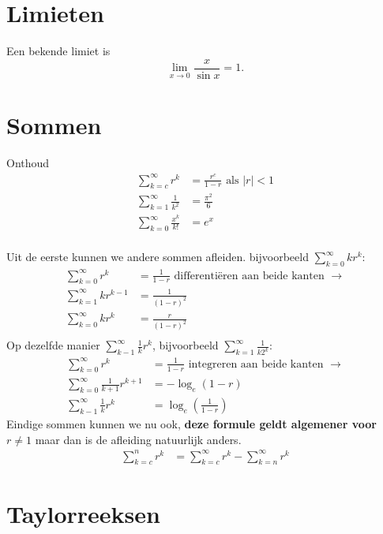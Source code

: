 \documentclass{article}
\begin{document}
	\tableofcontents
	\newpage

	\section{Limieten}\label{sec:limieten}
    Een bekende limiet is
    \[
        \lim_{x\to 0} \frac{x}{\sin x} = 1.
    \]
	\section{Sommen}\label{sec:sommen}
 		Onthoud
 		\begin{align*}
 			\sum_{k=c}^{\infty} r^k &= \frac{r^c}{1-r} \text{ als $|r|<1$}\\
 			\sum_{k=1}^{\infty} \frac{1}{k^2} &= \frac{\pi^2}{6} \\
 			\sum_{k=0}^\infty \frac{x^k}{k!} &= e^x \\
 		\end{align*}
 		
 		Uit de eerste kunnen we andere sommen afleiden.
 		bijvoorbeeld
 		$\displaystyle \sum_{k=0}^{\infty} kr^k: $
 		\begin{align*}
 				\sum_{k=0}^{\infty} r^k &= \frac{1}{1-r} \text { differenti\"eren aan beide kanten } \to \\
 				\sum_{k=1}^{\infty} kr^{k-1} &= \frac{1}{(1-r)^2} \\
 				\sum_{k=0}^{\infty} kr^k &= \frac{r}{(1-r)^2} \\
 		\end{align*}
 		Op dezelfde manier $\displaystyle \sum_{k-1}^\infty \frac{1}{k} r^k$, bijvoorbeeld $\displaystyle \sum_{k=1}^{\infty} \frac{1}{k2^k}$:
 		\begin{align*}
 				\sum_{k=0}^{\infty} r^k &= \frac{1}{1-r} \text { integreren aan beide kanten } \to \\
 				\sum_{k=0}^{\infty} \frac{1}{k+1} r^{k+1} &= -\log_e (1-r) \\
 				\sum_{k-1}^\infty \frac{1}{k} r^k &= \log_e (\frac{1}{1-r})
 		\end{align*}
 		Eindige sommen kunnen we nu ook, \textbf{deze formule geldt algemener voor $r\neq 1$} maar dan is de afleiding natuurlijk anders.
 		\begin{align*}
 			\sum_{k=c}^n r^k &= \sum_{k=c}^\infty r^k - \sum_{k=n}^\infty r^k
 		\end{align*}

	\section{Taylorreeksen}\label{sec:taylorreeksen}
	
\end{document}
